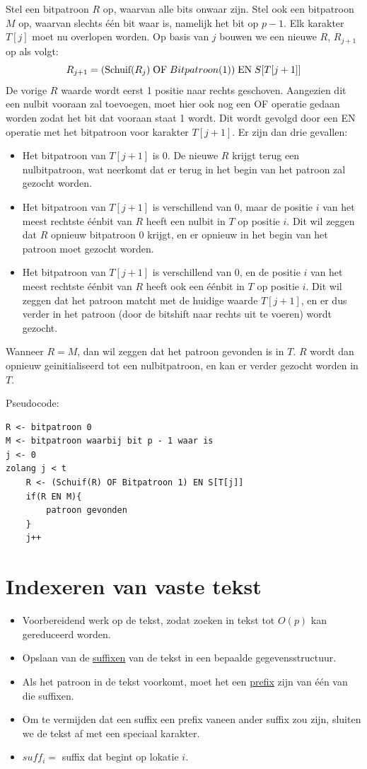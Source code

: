 \documentclass{report}
\begin{document}
\begin{enumerate}
	Stel een bitpatroon $R$ op, waarvan alle bits onwaar zijn. Stel ook een bitpatroon $M$ op, waarvan slechts één bit waar is, namelijk het bit op $p - 1$. Elk karakter $T[j]$ moet nu overlopen worden. Op basis van $j$ bouwen we een nieuwe $R$, $R_{j + 1}$ op  als volgt:
	$$R_{j + 1} = (\hbox{Schuif}(R_j)\;\hbox{OF}\;Bitpatroon(1))\;\hbox{EN}\;S[T[j + 1]]$$
	De vorige $R$ waarde wordt eerst 1 positie naar rechts geschoven. Aangezien dit een nulbit vooraan zal toevoegen, moet hier ook nog een OF operatie gedaan worden zodat het bit dat vooraan staat 1 wordt. Dit wordt gevolgd door een EN operatie met het bitpatroon voor karakter $T[j + 1]$. Er zijn dan drie gevallen:
	\begin{itemize}
		\item Het bitpatroon van $T[j + 1]$ is 0. De nieuwe $R$ krijgt terug een nulbitpatroon, wat neerkomt dat er terug in het begin van het patroon zal gezocht worden.
		\item Het bitpatroon van $T[j + 1]$ is verschillend van 0, maar de positie $i$ van het meest rechtste éénbit van $R$ heeft een nulbit in $T$ op positie $i$. Dit wil zeggen dat $R$ opnieuw bitpatroon 0 krijgt, en er opnieuw in het begin van het patroon moet gezocht worden.
		\item Het bitpatroon van $T[j + 1]$ is verschillend van 0, en de positie $i$ van het meest rechtste éénbit van $R$ heeft ook een éénbit in $T$ op positie $i$. Dit wil zeggen dat het patroon matcht met de huidige waarde $T[j + 1]$, en er dus verder in het patroon (door de bitshift naar rechts uit te voeren) wordt gezocht.
	\end{itemize}

	Wanneer $R = M$, dan wil zeggen dat het patroon gevonden is in $T$. $R$ wordt dan opnieuw geinitialiseerd tot een nulbitpatroon, en kan er verder gezocht worden in $T$.

	Pseudocode:
	\begin{lstlisting}
R <- bitpatroon 0
M <- bitpatroon waarbij bit p - 1 waar is
j <- 0
zolang j < t 
	R <- (Schuif(R) OF Bitpatroon 1) EN S[T[j]]
	if(R EN M){
		patroon gevonden
	} 
	j++
	\end{lstlisting}
\end{enumerate}
\chapter{Indexeren van vaste tekst}
\begin{itemize}
	\item[\info] Voorbereidend werk op de tekst, zodat zoeken in tekst tot $O(p)$ kan gereduceerd worden.
	\item[\info] Opslaan van de \underline{suffixen} van de tekst in een bepaalde gegevensstructuur.
	\item[\info] Als het patroon in de tekst voorkomt, moet het een \underline{prefix} zijn van één van die suffixen.
	\item[\info] Om te vermijden dat een suffix een prefix vaneen ander suffix zou zijn, sluiten we de tekst af met een speciaal karakter.
	\item[\info] $suff_i = $ suffix dat begint op lokatie $i$.   

\end{itemize}
\end{document}
